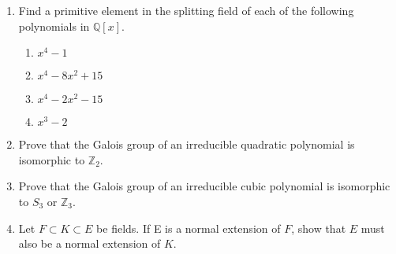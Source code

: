 {\begin{enumerate}
\begin{multicols}{2}
\begin{enumerate}
\item 
$x^5 - 12 x^2 + 2$

\item 
$x^5 - 4 x^4 + 2 x + 2$

\item 
$x^3 - 5$

\item 
$x^4 - x^2 - 6$

\item 
$x^5 + 1$

\item 
$(x^2 - 2)(x^2 + 2)$

\item 
$x^8 - 1$

\item 
$x^8 + 1$

\item 
$x^4 - 3 x^2 -10$


\end{enumerate}
\end{multicols}
 
 
 
\item
Find a primitive element in the splitting field of each of the
following polynomials in ${\mathbb Q}[x]$.
\begin{multicols}{2}
\begin{enumerate}

\item 
$x^4 - 1$

\item 
$x^4 - 8 x^2 + 15$

\item 
$x^4 - 2 x^2 - 15$

\item 
$x^3 - 2$

\end{enumerate}
\end{multicols}
  
 
 
 
 
 
\item
Prove that the Galois group of an irreducible quadratic polynomial is
isomorphic to ${\mathbb Z}_2$.
 
 
\item
Prove that the Galois group of an irreducible cubic polynomial is
isomorphic to $S_3$ or ${\mathbb Z}_3$.
 
 
\item
Let $F \subset K \subset E$ be fields. If E is a normal extension of
$F$, show that $E$ must also be a normal extension of $K$.
 

\end{enumerate}}
